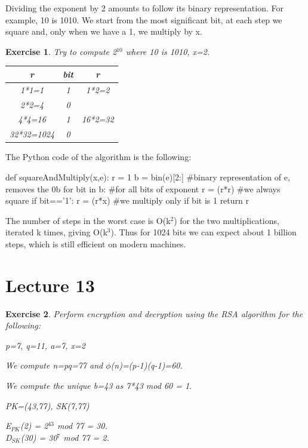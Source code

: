 \documentclass[a4paper, 12pt]{report}
\newtheorem{exercise}{\textbf{Exercise}}
\begin{document}
Dividing the exponent by 2 amounts to follow its binary representation. For example, 10 is 1010. We start from the most significant bit, at each step we square and, only when we have a 1, we multiply by x.
\newpage
\begin{exercise}
	Try to compute 2$^{10}$ where 10 is 1010, x=2.
	\begin{table}[H]
		\centering
		\begin{tabular}{|c|c|c|}
			\hline
			\textbf{r} & \textbf{bit} & \textbf{r}\\ \hline
			1*1=1 & 1 & 1*2=2\\
			2*2=4 & 0 & \\
			4*4=16 & 1 & 16*2=32\\
			32*32=1024 & 0 &\\ \hline
		\end{tabular}
	\end{table}
\end{exercise}

The Python code of the algorithm is the following:
\begin{python}
	def squareAndMultiply(x,e):
		r = 1
		b = bin(e)[2:]		#binary representation of e, removes the 0b
		for bit in b:			#for all bits of exponent
			r = (r*r)				#we always square
			if bit=='1':
				r = (r*x)			#we multiply only if bit is 1
		return r
\end{python}

The number of steps in the worst case is O(k$^2$) for the two multiplications, iterated k times, giving O(k$^3$). Thus for 1024 bits we can expect about 1 billion steps, which is still efficient on modern machines.

\chapter*{Lecture 13}
\begin{exercise}
	Perform encryption and decryption using the RSA algorithm for the following:
	\begin{center}
		p=7, q=11, a=7, x=2
	\end{center} 

	We compute n=pq=77 and $\phi$(n)=(p-1)(q-1)=60.
	
	We compute the unique b=43 as 7*43 mod 60 = 1.
	
	PK=(43,77), SK(7,77)
	
	E$_{PK}$(2) = 2$^43$ mod 77 = 30.\\
	D$_{SK}$(30) = 30$^7$ mod 77 = 2.
\end{exercise}
\end{document}
